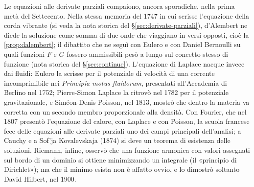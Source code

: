 \begin{notastorica}
Le equazioni alle derivate parziali compaiono, ancora sporadiche, nella prima metà del
Settecento. Nella stessa memoria del 1747 in cui scrisse l'equazione della corda vibrante
(si veda la nota storica del \S\ref{sec:derivate-parziali}), d'Alembert ne diede la
soluzione come somma di due onde che viaggiano in versi opposti, cioè la
\cref{prop:dalembert}; il dibattito che ne seguì con Eulero e con Daniel Bernoulli su quali
funzioni $F$ e $G$ fossero ammissibili pesò a lungo sul concetto stesso di funzione
(nota storica del \S\ref{sec:continue}). L'equazione di
Laplace nacque invece dai fluidi: Eulero la scrisse per il potenziale di velocità di una
corrente incomprimibile nei \emph{Principia motus fluidorum}, presentati all'Accademia di
Berlino nel 1752; Pierre-Simon Laplace la ritrovò nel 1782 per il potenziale
gravitazionale, e Siméon-Denis Poisson, nel 1813, mostrò che dentro la materia va corretta
con un secondo membro proporzionale alla densità. Con Fourier, che nel 1807 presentò
l'equazione del calore, con Laplace e con Poisson, la scuola francese fece delle equazioni
alle derivate parziali uno dei campi principali dell'analisi; a Cauchy e a Sof'ja
Kovalevskaja (1874) si deve un teorema di esistenza delle soluzioni. Riemann,
infine, osservò che una funzione armonica con valori assegnati sul bordo di un dominio si
ottiene minimizzando un integrale (il «principio di Dirichlet»); ma che il minimo esista
non è affatto ovvio, e lo dimostrò soltanto David Hilbert, nel 1900.
\end{notastorica}
